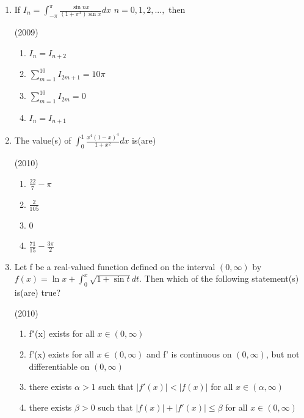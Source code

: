 \documentclass[journal,12pt,twocolumn]{IEEEtran}
\theoremstyle{remark}
\begin{document}
\begin{enumerate}
		\hfill{(2009)}
		\begin{enumerate}[label=(\alph*)]
			\item $e-1$
			\item $\int_{1}^{e}\ln (e+1-y)dy$
			\item $e-\int_{0}^{1}e^xdx$
			\item $\int_{1}^{e}\ln ydy$
		\end{enumerate}
	\item 
		If $I_n=\int_{-\pi}^{\pi}\frac{\sin{nx}}{(1+{\pi}^x)\sin x}dx$ $n=0,1,2, ...,$ then

		\hfill{(2009)}
		\begin{enumerate}[label=(\alph*)]
			\item $I_{n}=I_{n+2}$
			\item $\sum_{m=1}^{10}I_{2m+1}=10\pi$
			\item $\sum_{m=1}^{10}I_{2m}=0$
			\item $I_{n}=I_{n+1}$
		\end{enumerate}
	\item 
		The value(s) of $\int_{0}^{1}\frac{x^4(1-x)^4}{1+x^2}dx$ is(are)

		\hfill{(2010)}
		\begin{enumerate}[label=(\alph*)]
			\item  $\frac{22}{7}-\pi$
			\item $\frac{2}{105}$
			\item $0$
			\item $\frac{71}{15}-\frac{3\pi}{2}$
		\end{enumerate}
	\item 
		Let f be a real-valued function defined on the interval $(0,\infty)$ by $f(x)=\ln x+\int_{0}^{x}\sqrt{1+\sin t}dt$. Then which of the following statement(s) is(are) true?

		\hfill{(2010)}
		\begin{enumerate}[label=(\alph*)]
			\item f"(x) exists for all $x\in(0,\infty)$
			\item f'(x) exists for all $x\in(0,\infty)$ and f' is continuous on $(0,\infty)$, but not differentiable on $(0,\infty)$
			\item there exists $\alpha>1$ such that $|f'(x)|<|f(x)|$ for all $x\in(\alpha,\infty)$
			\item there exists $\beta>0$ such that $|f(x)|+|f'(x)|\leq\beta$ for all $x\in(0,\infty)$
		\end{enumerate}







\end{enumerate}
\end{document}
